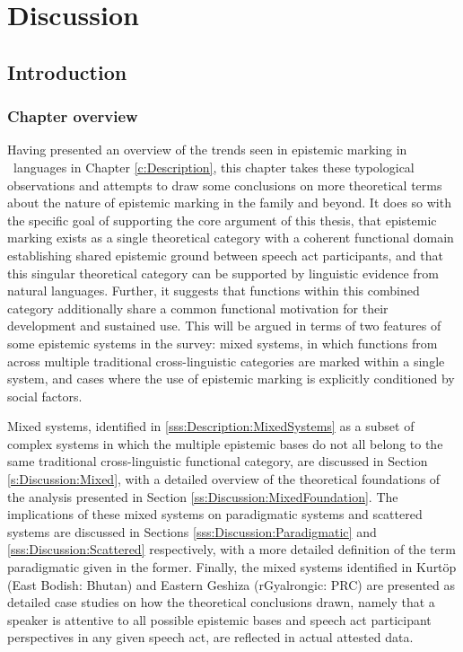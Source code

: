 \chapter{Discussion}\label{c:Discussion}
\section{Introduction}\label{s:Discussion:Introduction}
\subsection{Chapter overview}
Having presented an overview of the trends seen in epistemic marking in \lfam\ languages in Chapter \ref{c:Description}, this chapter takes these typological observations and attempts to draw some conclusions on more theoretical terms about the nature of epistemic marking in the family and beyond. It does so with the specific goal of supporting the core argument of this thesis, that epistemic marking exists as a single theoretical category with a coherent functional domain establishing shared epistemic ground between speech act participants, and that this singular theoretical category can be supported by linguistic evidence from natural languages. Further, it suggests that functions within this combined category additionally share a common functional motivation for their development and sustained use. This will be argued in terms of two features of some epistemic systems in the survey: mixed systems, in which functions from across multiple traditional cross-linguistic categories are marked within a single system, and cases where the use of epistemic marking is explicitly conditioned by social factors.

Mixed systems, identified in \ref{sss:Description:MixedSystems} as a subset of complex systems in which the multiple epistemic bases do not all belong to the same traditional cross-linguistic functional category, are discussed in Section \ref{s:Discussion:Mixed}, with a detailed overview of the theoretical foundations of the analysis presented in Section \ref{ss:Discussion:MixedFoundation}. The implications of these mixed systems on paradigmatic systems and scattered systems are discussed in Sections \ref{sss:Discussion:Paradigmatic} and \ref{sss:Discussion:Scattered} respectively, with a more detailed definition of the term paradigmatic given in the former. Finally, the mixed systems identified in Kurtöp (East Bodish: Bhutan) and Eastern Geshiza (rGyalrongic: PRC) are presented as detailed case studies on how the theoretical conclusions drawn, namely that a speaker is attentive to all possible epistemic bases and speech act participant perspectives in any given speech act, are reflected in actual attested data.

